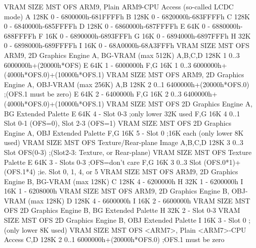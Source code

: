\documentclass[11pt,a4paper]{proc}
\begin{document}
\begin{flushleft}
  VRAM    SIZE  MST  OFS   ARM9, Plain ARM9-CPU Access (so-called LCDC mode)
  A       128K  0    -     6800000h-681FFFFh
  B       128K  0    -     6820000h-683FFFFh
  C       128K  0    -     6840000h-685FFFFh
  D       128K  0    -     6860000h-687FFFFh
  E       64K   0    -     6880000h-688FFFFh
  F       16K   0    -     6890000h-6893FFFh
  G       16K   0    -     6894000h-6897FFFh
  H       32K   0    -     6898000h-689FFFFh
  I       16K   0    -     68A0000h-68A3FFFh
  VRAM    SIZE  MST  OFS   ARM9, 2D Graphics Engine A, BG-VRAM (max 512K)
  A,B,C,D 128K  1    0..3  6000000h+(20000h*OFS)
  E       64K   1    -     6000000h
  F,G     16K   1    0..3  6000000h+(4000h*OFS.0)+(10000h*OFS.1)
  VRAM    SIZE  MST  OFS   ARM9, 2D Graphics Engine A, OBJ-VRAM (max 256K)
  A,B     128K  2    0..1  6400000h+(20000h*OFS.0)  ;(OFS.1 must be zero)
  E       64K   2    -     6400000h
  F,G     16K   2    0..3  6400000h+(4000h*OFS.0)+(10000h*OFS.1)
  VRAM    SIZE  MST  OFS   2D Graphics Engine A, BG Extended Palette
  E       64K   4    -     Slot 0-3  ;only lower 32K used
  F,G     16K   4    0..1  Slot 0-1 (OFS=0), Slot 2-3 (OFS=1)
  VRAM    SIZE  MST  OFS   2D Graphics Engine A, OBJ Extended Palette
  F,G     16K   5    -     Slot 0  ;16K each (only lower 8K used)
  VRAM    SIZE  MST  OFS   Texture/Rear-plane Image
  A,B,C,D 128K  3    0..3  Slot OFS(0-3)   ;(Slot2-3: Texture, or Rear-plane)
  VRAM    SIZE  MST  OFS   Texture Palette
  E       64K   3    -     Slots 0-3                 ;OFS=don't care
  F,G     16K   3    0..3  Slot (OFS.0*1)+(OFS.1*4)  ;ie. Slot 0, 1, 4, or 5
  VRAM    SIZE  MST  OFS   ARM9, 2D Graphics Engine B, BG-VRAM (max 128K)
  C       128K  4    -     6200000h
  H       32K   1    -     6200000h
  I       16K   1    -     6208000h
  VRAM    SIZE  MST  OFS   ARM9, 2D Graphics Engine B, OBJ-VRAM (max 128K)
  D       128K  4    -     6600000h
  I       16K   2    -     6600000h
  VRAM    SIZE  MST  OFS   2D Graphics Engine B, BG Extended Palette
  H       32K   2    -     Slot 0-3
  VRAM    SIZE  MST  OFS   2D Graphics Engine B, OBJ Extended Palette
  I       16K   3    -     Slot 0  ;(only lower 8K used)
  VRAM    SIZE  MST  OFS   <ARM7>, Plain <ARM7>-CPU Access
  C,D     128K  2    0..1  6000000h+(20000h*OFS.0)  ;OFS.1 must be zero



\end{flushleft}
\end{document}
